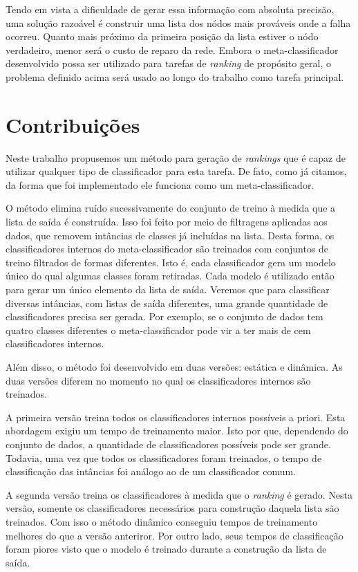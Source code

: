 Tendo em vista a dificuldade de gerar essa informação com absoluta precisão, uma solução razoável é construir uma lista dos nódos mais prováveis onde a falha ocorreu.
Quanto mais próximo da primeira posição da lista estiver o nódo verdadeiro, menor será o custo de reparo da rede.
Embora o meta-classificador desenvolvido possa ser utilizado para tarefas de \textit{ranking} de propósito geral, o problema definido acima será usado ao longo do trabalho como tarefa principal.

\section{Contribuições}

Neste trabalho propusemos um método para geração de \textit{rankings} que é capaz de utilizar qualquer tipo de classificador para esta tarefa.
De fato, como já citamos, da forma que foi implementado ele funciona como um meta-classificador.

O método elimina ruído sucessivamente do conjunto de treino à medida que a lista de saída é construída.
Isso foi feito por meio de filtragens aplicadas aos dados, que removem intâncias de classes já incluídas na lista.
Desta forma, os classificadores internos do meta-classificador são treinados com conjuntos de treino filtrados de formas diferentes.
Isto é, cada classificador gera um modelo único do qual algumas classes foram retiradas.
Cada modelo é utilizado então para gerar um único elemento da lista de saída.
Veremos que para classificar diversas intâncias, com listas de saída diferentes, uma grande quantidade de classificadores precisa ser gerada.
Por exemplo, se o conjunto de dados tem quatro classes diferentes o meta-classificador pode vir a ter mais de cem classificadores internos.

Além disso, o método foi desenvolvido em duas versões: estática e dinâmica.
As duas versões diferem no momento no qual os classificadores internos são treinados.

A primeira versão treina todos os classificadores internos possíveis a priori.
Esta abordagem exigiu um tempo de treinamento maior.
Isto por que, dependendo do conjunto de dados, a quantidade de classificadores possíveis pode ser grande.
Todavia, uma vez que todos os classificadores foram treinados, o tempo de classificação das intâncias foi análogo ao de um classificador comum.

A segunda versão treina os classificadores à medida que o \textit{ranking} é gerado.
Nesta versão, somente os classificadores necessários para construção daquela lista são treinados.
Com isso o método dinâmico conseguiu tempos de treinamento melhores do que a versão anteriror.
Por outro lado, seus tempos de classificação foram piores visto que o modelo é treinado durante a construção da lista de saída.

